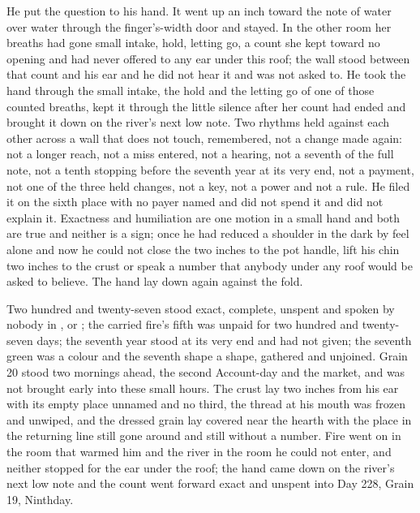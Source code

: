 He put the question to his hand. It went up an inch toward the note of water over water through the finger's-width door and stayed. In the other room her breaths had gone small intake, hold, letting go, a count she kept toward no opening and had never offered to any ear under this roof; the wall stood between that count and his ear and he did not hear it and was not asked to. He took the hand through the small intake, the hold and the letting go of one of those counted breaths, kept it through the little silence after her count had ended and brought it down on the river's next low note. Two rhythms held against each other across a wall that does not touch, remembered, not a change made again: not a longer reach, not a miss entered, not a hearing, not a seventh of the full note, not a tenth stopping before the seventh year at its very end, not a payment, not one of the three held changes, not a key, not a power and not a rule. He filed it on the sixth place with no payer named and did not spend it and did not explain it. Exactness and humiliation are one motion in a small hand and both are true and neither is a sign; once he had reduced a shoulder in the dark by feel alone and now he could not close the two inches to the pot handle, lift his chin two inches to the crust or speak a number that anybody under any roof would be asked to believe. The hand lay down again against the fold.

Two hundred and twenty-seven stood exact, complete, unspent and spoken by nobody in ,  or ; the carried fire's fifth was unpaid for two hundred and twenty-seven days; the seventh year stood at its very end and had not given; the seventh green was a colour and the seventh shape a shape, gathered and unjoined. Grain 20 stood two mornings ahead, the second Account-day and the market, and was not brought early into these small hours. The crust lay two inches from his ear with its empty place unnamed and no third, the thread at his mouth was frozen and unwiped, and the dressed grain lay covered near the hearth with the place in the returning line still gone around and still without a number. Fire went on in the room that warmed him and the river in the room he could not enter, and neither stopped for the ear under the roof; the hand came down on the river's next low note and the count went forward exact and unspent into Day 228, Grain 19, Ninthday.
